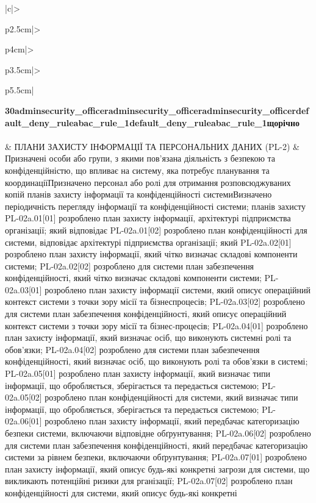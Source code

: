 \documentclass[10pt]{article}
\begin{document}
\begin{longtable}{|c|>{\raggedright\arraybackslash}p{2.5cm}|>{\raggedright\arraybackslash}p{4cm}|>{\raggedright\arraybackslash}p{3.5cm}|>{\raggedright\arraybackslash}p{5.5cm}|}
\textbf{30}\newline \textbf{adminsecurity\_\allowbreak{}officer}\newline \textbf{adminsecurity\_\allowbreak{}officer}\newline \textbf{adminsecurity\_\allowbreak{}officer}\newline \textbf{default\_\allowbreak{}deny\_\allowbreak{}ruleabac\_\allowbreak{}rule\_\allowbreak{}1}\newline \textbf{default\_\allowbreak{}deny\_\allowbreak{}ruleabac\_\allowbreak{}rule\_\allowbreak{}1}\newline \textbf{щорічно} \\ \hline
{} \\  & ПЛАНИ ЗАХИСТУ ІНФОРМАЦІЇ ТА ПЕРСОНАЛЬНИХ ДАНИХ (PL-2) & Призначені особи або групи, з якими пов'язана діяльність з безпекою та конфіденційністю, що впливає на систему, яка потребує планування та координації\newline Призначено персонал або ролі для отримання розповсюджуваних копій планів захисту інформації та конфіденційності системи\newline Визначено періодичність перегляду інформації та конфіденційності системи; планів захисту PL-02a.01[01] розроблено план захисту інформації, архітектурі підприємства організації; який відповідає PL-02a.01[02] розроблено план конфіденційності для системи, відповідає архітектурі підприємства організації; який PL-02a.02[01] розроблено план захисту інформації, який чітко визначає складові компоненти системи; PL-02a.02[02] розроблено для системи план забезпечення конфіденційності, який чітко визначає складові компоненти системи; PL-02a.03[01] розроблено план захисту інформації системи, який описує операційний контекст системи з точки зору місії та бізнеспроцесів; PL-02a.03[02] розроблено для системи план забезпечення конфіденційності, який описує операційний контекст системи з точки зору місії та бізнес-процесів; PL-02a.04[01] розроблено план захисту інформації, який визначає осіб, що виконують системні ролі та обов'язки; PL-02a.04[02] розроблено для системи план забезпечення конфіденційності, який визначає осіб, що виконують ролі та обов'язки в системі; PL-02a.05[01] розроблено план захисту інформації, який визначає типи інформації, що обробляється, зберігається та передається системою; PL-02a.05[02] розроблено план конфіденційності для системи, який визначає типи інформації, що обробляється, зберігається та передається системою; PL-02a.06[01] розроблено план захисту інформації, який передбачає категоризацію безпеки системи, включаючи відповідне обґрунтування; PL-02a.06[02] розроблено для системи план забезпечення конфіденційності, який передбачає категоризацію системи за рівнем безпеки, включаючи обґрунтування; PL-02a.07[01] розроблено план захисту інформації, який описує будь-які конкретні загрози для системи, що викликають потенційні ризики для рганізації; PL-02a.07[02] розроблено план конфіденційності для системи, який описує будь-які конкретні 
\end{longtable}
\end{document}
